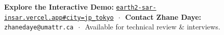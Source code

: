 \documentclass[10pt,letterpaper]{article}
\begin{document}
\vspace{-2pt}

\begin{tcolorbox}[colframe=synspectivecrimson,colback=synspectivecrimson,coltext=white,boxrule=0pt,top=4pt,bottom=4pt]
\centering\footnotesize
\textbf{Explore the Interactive Demo:} \href{https://earth2-sar-insar.vercel.app#city=jp_tokyo&preset=sar_focus&stage=v3}{\texttt{earth2-sar-insar.vercel.app\#city=jp\_tokyo}} $\,\cdot\,$ 
\textbf{Contact Zhane Daye:} \texttt{zhanedaye@umattr.ca} $\,\cdot\,$ Available for technical review \& interviews.
\end{tcolorbox}
\end{document}
